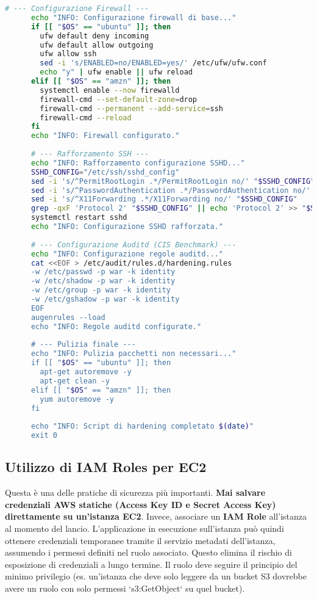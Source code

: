 \begin{lstlisting}[language=Bash, caption={Script di Hardening del Sistema Operativo (hardening\_script.sh)}, label={lst:hardening_script}]
      # --- Configurazione Firewall ---
      echo "INFO: Configurazione firewall di base..."
      if [[ "$OS" == "ubuntu" ]]; then
        ufw default deny incoming
        ufw default allow outgoing
        ufw allow ssh
        sed -i 's/ENABLED=no/ENABLED=yes/' /etc/ufw/ufw.conf
        echo "y" | ufw enable || ufw reload
      elif [[ "$OS" == "amzn" ]]; then
        systemctl enable --now firewalld
        firewall-cmd --set-default-zone=drop
        firewall-cmd --permanent --add-service=ssh
        firewall-cmd --reload
      fi
      echo "INFO: Firewall configurato."
      
      # --- Rafforzamento SSH ---
      echo "INFO: Rafforzamento configurazione SSHD..."
      SSHD_CONFIG="/etc/ssh/sshd_config"
      sed -i 's/^PermitRootLogin .*/PermitRootLogin no/' "$SSHD_CONFIG"
      sed -i 's/^PasswordAuthentication .*/PasswordAuthentication no/' "$SSHD_CONFIG"
      sed -i 's/^X11Forwarding .*/X11Forwarding no/' "$SSHD_CONFIG"
      grep -qxF 'Protocol 2' "$SSHD_CONFIG" || echo 'Protocol 2' >> "$SSHD_CONFIG"
      systemctl restart sshd
      echo "INFO: Configurazione SSHD rafforzata."
      
      # --- Configurazione Auditd (CIS Benchmark) ---
      echo "INFO: Configurazione regole auditd..."
      cat <<EOF > /etc/audit/rules.d/hardening.rules
      -w /etc/passwd -p war -k identity
      -w /etc/shadow -p war -k identity
      -w /etc/group -p war -k identity
      -w /etc/gshadow -p war -k identity
      EOF
      augenrules --load
      echo "INFO: Regole auditd configurate."
      
      # --- Pulizia finale ---
      echo "INFO: Pulizia pacchetti non necessari..."
      if [[ "$OS" == "ubuntu" ]]; then
        apt-get autoremove -y
        apt-get clean -y
      elif [[ "$OS" == "amzn" ]]; then
        yum autoremove -y
      fi
      
      echo "INFO: Script di hardening completato $(date)"
      exit 0
          \end{lstlisting}

\subsection{Utilizzo di IAM Roles per EC2}
\label{subsec:iam-roles-ec2}
Questa è una delle pratiche di sicurezza più importanti. \textbf{Mai salvare credenziali AWS statiche (Access Key ID e Secret Access Key) direttamente su un'istanza EC2}. Invece, associare un \textbf{IAM Role} all'istanza al momento del lancio. L'applicazione in esecuzione sull'istanza può quindi ottenere credenziali temporanee tramite il servizio metadati dell'istanza, assumendo i permessi definiti nel ruolo associato. Questo elimina il rischio di esposizione di credenziali a lungo termine. Il ruolo deve seguire il principio del minimo privilegio (es. un'istanza che deve solo leggere da un bucket S3 dovrebbe avere un ruolo con solo permessi `s3:GetObject` su quel bucket).

